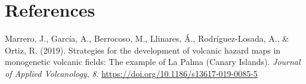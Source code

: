 \documentclass[
]{agujournal2019}
\newlength{\cslhangindent}
\newenvironment{CSLReferences}[2] %
 {\begin{list}{}{%
  \setlength{\itemindent}{0pt}
  \setlength{\leftmargin}{0pt}
  \setlength{\parsep}{0pt}
  \ifodd #1
   \setlength{\leftmargin}{\cslhangindent}
   \setlength{\itemindent}{-1\cslhangindent}
  \fi
  \setlength{\itemsep}{#2\baselineskip}}}
 {\end{list}}
\begin{document}
\section*{References}\label{references}

\label{refs}
\begin{CSLReferences}{1}{0}
\vspace{1em}

Marrero, J., García, A., Berrocoso, M., Llinares, Á., Rodríguez-Losada,
A., \& Ortiz, R. (2019). Strategies for the development of volcanic
hazard maps in monogenetic volcanic fields: The example of {La} {Palma}
({Canary} {Islands}). \emph{Journal of Applied Volcanology}, \emph{8}.
\url{https://doi.org/10.1186/s13617-019-0085-5}

\end{CSLReferences}
\end{document}
